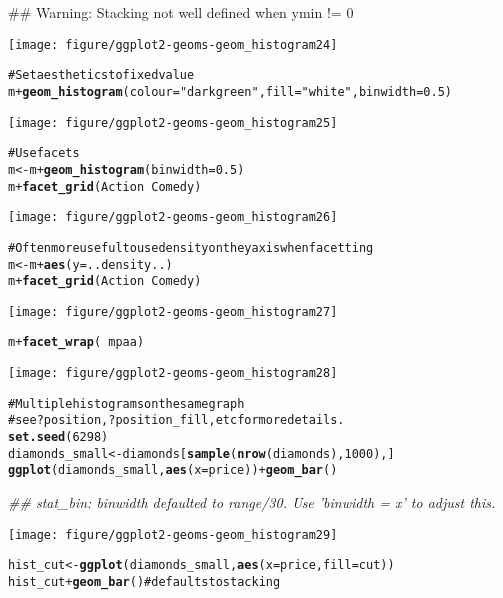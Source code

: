 \documentclass[a4paper,titlepage]{tufte-handout}\usepackage{graphicx, color}
\makeatletter
\def\maxwidth{ %
  \ifdim\Gin@nat@width>\linewidth
    \linewidth
  \else
    \Gin@nat@width
  \fi
}
\newcommand{\hlfunctioncall}[1]{\textcolor[rgb]{0.501960784313725,0,0.329411764705882}{\textbf{#1}}}%
\newcommand{\hlstring}[1]{\textcolor[rgb]{0.6,0.6,1}{#1}}%
\newcommand{\hlcomment}[1]{\textcolor[rgb]{0.180392156862745,0.6,0.341176470588235}{#1}}%
\newenvironment{kframe}{%
 \def\at@end@of@kframe{}%
 \ifinner\ifhmode%
  \def\at@end@of@kframe{\end{minipage}}%
  \begin{minipage}{\columnwidth}%
 \fi\fi%
 \def\FrameCommand##1{\hskip\@totalleftmargin \hskip-\fboxsep
 \colorbox{shadecolor}{##1}\hskip-\fboxsep
     \hskip-\linewidth \hskip-\@totalleftmargin \hskip\columnwidth}%
 \MakeFramed {\advance\hsize-\width
   \@totalleftmargin\z@ \linewidth\hsize
   \@setminipage}}%
 {\par\unskip\endMakeFramed%
 \at@end@of@kframe}
\newenvironment{knitrout}{}{} %
\makeatother
\begin{document}
\begin{knitrout}
\begin{kframe}
{\ttfamily\noindent\textcolor{warningcolor}{\#\# Warning: Stacking not well defined when ymin != 0}}\end{kframe}\texttt{[image: figure/ggplot2-geoms-geom\_histogram24]} \begin{kframe}\begin{alltt}
\hlcomment{# Set aesthetics to fixed value}
m + \hlfunctioncall{geom_histogram}(colour = \hlstring{"darkgreen"}, fill = \hlstring{"white"}, binwidth = 0.5)
\end{alltt}
\end{kframe}\texttt{[image: figure/ggplot2-geoms-geom\_histogram25]} \begin{kframe}\begin{alltt}
\hlcomment{# Use facets}
m <- m + \hlfunctioncall{geom_histogram}(binwidth = 0.5)
m + \hlfunctioncall{facet_grid}(Action ~ Comedy)
\end{alltt}
\end{kframe}\texttt{[image: figure/ggplot2-geoms-geom\_histogram26]} \begin{kframe}\begin{alltt}
\hlcomment{# Often more useful to use density on the y axis when facetting}
m <- m + \hlfunctioncall{aes}(y = ..density..)
m + \hlfunctioncall{facet_grid}(Action ~ Comedy)
\end{alltt}
\end{kframe}\texttt{[image: figure/ggplot2-geoms-geom\_histogram27]} \begin{kframe}\begin{alltt}
m + \hlfunctioncall{facet_wrap}(~ mpaa)
\end{alltt}
\end{kframe}\texttt{[image: figure/ggplot2-geoms-geom\_histogram28]} \begin{kframe}\begin{alltt}
\hlcomment{# Multiple histograms on the same graph}
\hlcomment{# see ?position, ?position_fill, etc for more details.}
\hlfunctioncall{set.seed}(6298)
diamonds_small <- diamonds[\hlfunctioncall{sample}(\hlfunctioncall{nrow}(diamonds), 1000), ]
\hlfunctioncall{ggplot}(diamonds_small, \hlfunctioncall{aes}(x=price)) + \hlfunctioncall{geom_bar}()
\end{alltt}


{\ttfamily\noindent\itshape\textcolor{messagecolor}{\#\# stat\_bin: binwidth defaulted to range/30. Use 'binwidth = x' to adjust this.}}\end{kframe}\texttt{[image: figure/ggplot2-geoms-geom\_histogram29]} \begin{kframe}\begin{alltt}
hist_cut <- \hlfunctioncall{ggplot}(diamonds_small, \hlfunctioncall{aes}(x=price, fill=cut))
hist_cut + \hlfunctioncall{geom_bar}() \hlcomment{# defaults to stacking}
\end{alltt}



\end{kframe}
\end{knitrout}
\end{document}
